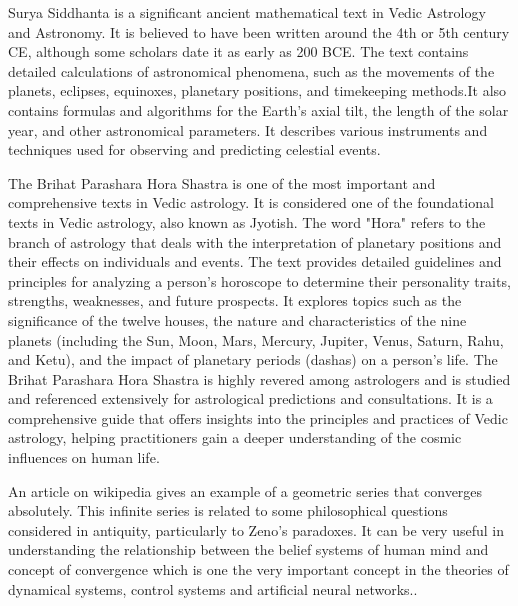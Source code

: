 Surya Siddhanta is a significant ancient mathematical text in Vedic Astrology and Astronomy. It is believed to have been written around the 4th or 5th century CE, although some scholars date it as early as 200 BCE. The text contains detailed calculations of astronomical phenomena, such as the movements of the planets, eclipses, equinoxes, planetary positions, and timekeeping methods.It also contains formulas and algorithms for the Earth's axial tilt, the length of the solar year, and other astronomical parameters. It describes various instruments and techniques used for observing and predicting celestial events\cite{SuryaSiddhanta, wiki:ss}.
\vspace{1\baselineskip}

The Brihat Parashara Hora Shastra is one of the most important and comprehensive texts in Vedic astrology. It is considered one of the foundational texts in Vedic astrology, also known as Jyotish. The word "Hora" refers to the branch of astrology that deals with the interpretation of planetary positions and their effects on individuals and events. The text provides detailed guidelines and principles for analyzing a person's horoscope to determine their personality traits, strengths, weaknesses, and future prospects. It explores topics such as the significance of the twelve houses, the nature and characteristics of the nine planets (including the Sun, Moon, Mars, Mercury, Jupiter, Venus, Saturn, Rahu, and Ketu), and the impact of planetary periods (dashas) on a person's life. The Brihat Parashara Hora Shastra is highly revered among astrologers and is studied and referenced extensively for astrological predictions and consultations. It is a comprehensive guide that offers insights into the principles and practices of Vedic astrology, helping practitioners gain a deeper understanding of the cosmic influences on human life\cite{BrihatParasharHoraShastraVol1,BrihatParasharHoraShastraVol2, wiki:bphs}.
\vspace{1\baselineskip}

An article on wikipedia gives an example of a geometric series that converges absolutely. This infinite series is related to some philosophical questions considered in antiquity, particularly to Zeno's paradoxes. It can be very useful in understanding the relationship between the belief systems of human mind and concept of convergence which is one the very important concept in the theories of dynamical systems, control systems and artificial neural networks.\cite{enwiki:1123380424}.
\vspace{1\baselineskip}

